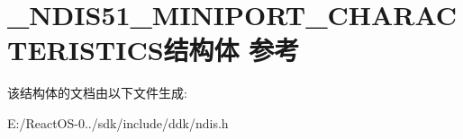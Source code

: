 \hypertarget{struct___n_d_i_s51___m_i_n_i_p_o_r_t___c_h_a_r_a_c_t_e_r_i_s_t_i_c_s}{}\section{\+\_\+\+N\+D\+I\+S51\+\_\+\+M\+I\+N\+I\+P\+O\+R\+T\+\_\+\+C\+H\+A\+R\+A\+C\+T\+E\+R\+I\+S\+T\+I\+C\+S结构体 参考}
\label{struct___n_d_i_s51___m_i_n_i_p_o_r_t___c_h_a_r_a_c_t_e_r_i_s_t_i_c_s}


该结构体的文档由以下文件生成\+:\begin{DoxyCompactItemize}
\item 
E\+:/\+React\+O\+S-\/0../sdk/include/ddk/ndis.\+h\end{DoxyCompactItemize}
